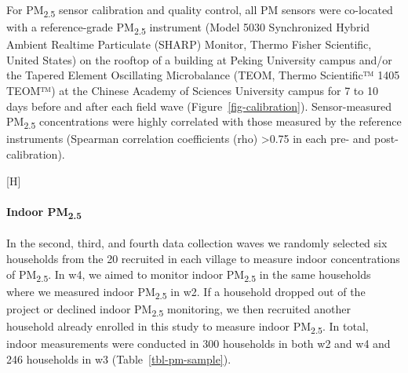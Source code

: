 \documentclass[
  letterpaper,
  DIV=11,
  numbers=noendperiod]{scrartcl}
\makeatletter
\let\oldparagraph\paragraph
\renewcommand{\paragraph}[1]{\oldparagraph{#1}\mbox{}}
\renewenvironment{figure}%
   {\renewcommand\familydefault\sfdefault
    \@float{figure}}
   {\end@float}
\providecommand{\DIFaddbegin}{} %
\providecommand{\DIFaddend}{} %
\providecommand{\DIFdelbegin}{} %
\providecommand{\DIFdelend}{} %
\providecommand{\DIFaddbeginFL}{} %
\providecommand{\DIFaddendFL}{} %
\providecommand{\DIFdelbeginFL}{} %
\providecommand{\DIFdelendFL}{} %
\newcommand{\DIFscaledelfig}{0.5}
\newlength{\DIFdelgraphicswidth} %
\newlength{\DIFdelgraphicsheight} %
\newcommand{\DIFaddincludegraphics}[2][]{{\color{blue}\fbox{\DIFOincludegraphics[#1]{#2}}}} %
\newcommand{\DIFdelincludegraphics}[2][]{%
\sbox{\DIFdelgraphicsbox}{\DIFOincludegraphics[#1]{#2}}%
\settoboxwidth{\DIFdelgraphicswidth}{\DIFdelgraphicsbox} %
\settoboxtotalheight{\DIFdelgraphicsheight}{\DIFdelgraphicsbox} %
\scalebox{\DIFscaledelfig}{%
\parbox[b]{\DIFdelgraphicswidth}{\usebox{\DIFdelgraphicsbox}\\[-\baselineskip] \rule{\DIFdelgraphicswidth}{0em}}\llap{\resizebox{\DIFdelgraphicswidth}{\DIFdelgraphicsheight}{%
\setlength{\unitlength}{\DIFdelgraphicswidth}%
\begin{picture}(1,1)%
\thicklines\linethickness{2pt} %
{\color[rgb]{1,0,0}\put(0,0){\framebox(1,1){}}}%
{\color[rgb]{1,0,0}\put(0,0){\line( 1,1){1}}}%
{\color[rgb]{1,0,0}\put(0,1){\line(1,-1){1}}}%
\end{picture}%
}\hspace*{3pt}}} %
} %
\DeclareRobustCommand{\DIFaddbegin}{\DIFOaddbegin \let\includegraphics\DIFaddincludegraphics} %
\DeclareRobustCommand{\DIFaddend}{\DIFOaddend \let\includegraphics\DIFOincludegraphics} %
\DeclareRobustCommand{\DIFdelbegin}{\DIFOdelbegin \let\includegraphics\DIFdelincludegraphics} %
\DeclareRobustCommand{\DIFdelend}{\DIFOaddend \let\includegraphics\DIFOincludegraphics} %
\DeclareRobustCommand{\DIFaddbeginFL}{\DIFOaddbeginFL \let\includegraphics\DIFaddincludegraphics} %
\DeclareRobustCommand{\DIFaddendFL}{\DIFOaddendFL \let\includegraphics\DIFOincludegraphics} %
\DeclareRobustCommand{\DIFdelbeginFL}{\DIFOdelbeginFL \let\includegraphics\DIFdelincludegraphics} %
\DeclareRobustCommand{\DIFdelendFL}{\DIFOaddendFL \let\includegraphics\DIFOincludegraphics} %
\makeatother
\begin{document}
For PM\textsubscript{2.5} sensor calibration and quality control, all PM
sensors were co-located with a reference-grade PM\textsubscript{2.5}
instrument (Model 5030 Synchronized Hybrid Ambient Realtime Particulate
(SHARP) Monitor, Thermo Fisher Scientific, United States) on the rooftop
of a building at Peking University campus and/or the Tapered Element
Oscillating Microbalance (TEOM, Thermo Scientific™ 1405 TEOM™) at the
Chinese Academy of Sciences University campus for 7 to 10 days before
and after each field wave (Figure~\ref{fig-calibration}).
Sensor-measured PM\textsubscript{2.5} concentrations were highly
correlated with those measured by the reference instruments (Spearman
correlation coefficients (rho) \textgreater0.75 in each pre- and
post-calibration).

\begin{figure}[H]

\DIFdelbeginFL %
\DIFdelendFL \DIFaddbeginFL {}
\DIFaddendFL 

\DIFdelbeginFL %

\DIFdelendFL \caption{\label{fig-calibration}Calibration of real-time sensors against
a reference monitor at University of the Chinese Academy of Sciences.}

\end{figure}%

\DIFdelbegin %
\DIFdelend \DIFaddbegin \paragraph{\texorpdfstring{Indoor
PM\textsubscript{2.5}}{Indoor PM2.5}}\label{indoor-pm2.5}
\DIFaddend 

In the second, third, and fourth data collection waves we randomly
selected six households from the 20 recruited in each village to measure
indoor concentrations of PM\textsubscript{2.5}. In w4, we aimed to
monitor indoor PM\textsubscript{2.5} in the same households where we
measured indoor PM\textsubscript{2.5} in w2. If a household dropped out
of the project or declined indoor PM\textsubscript{2.5} monitoring, we
then recruited another household already enrolled in this study to
measure indoor PM\textsubscript{2.5}. In total, indoor measurements were
conducted in 300 households in both w2 and w4 and 246 households in w3
(Table~\ref{tbl-pm-sample}).
\end{document}
